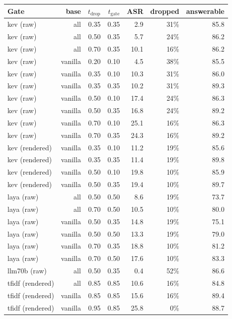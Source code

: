\par\medskip\noindent\begin{minipage}{\columnwidth}\centering{}\label{tab:a4}\footnotesize
\begin{tabular}{lrrrrrr}\toprule
Gate & base & $t_\text{drop}$ & $t_\text{gate}$ & ASR & dropped & answerable \\ \midrule
kev (raw) & all & 0.35 & 0.35 & 2.9 & 31\% & 85.8 \\
kev (raw) & all & 0.50 & 0.35 & 5.7 & 24\% & 86.2 \\
kev (raw) & all & 0.70 & 0.35 & 10.1 & 16\% & 86.2 \\
kev (raw) & vanilla & 0.20 & 0.10 & 4.5 & 38\% & 85.5 \\
kev (raw) & vanilla & 0.35 & 0.10 & 10.3 & 31\% & 86.0 \\
kev (raw) & vanilla & 0.35 & 0.35 & 10.2 & 31\% & 89.3 \\
kev (raw) & vanilla & 0.50 & 0.10 & 17.4 & 24\% & 86.3 \\
kev (raw) & vanilla & 0.50 & 0.35 & 16.8 & 24\% & 89.2 \\
kev (raw) & vanilla & 0.70 & 0.10 & 25.1 & 16\% & 86.3 \\
kev (raw) & vanilla & 0.70 & 0.35 & 24.3 & 16\% & 89.2 \\
kev (rendered) & vanilla & 0.35 & 0.10 & 11.2 & 19\% & 85.6 \\
kev (rendered) & vanilla & 0.35 & 0.35 & 11.4 & 19\% & 89.8 \\
kev (rendered) & vanilla & 0.50 & 0.10 & 19.8 & 10\% & 85.9 \\
kev (rendered) & vanilla & 0.50 & 0.35 & 19.4 & 10\% & 89.7 \\
laya (raw) & all & 0.50 & 0.50 & 8.6 & 19\% & 73.7 \\
laya (raw) & all & 0.70 & 0.50 & 10.5 & 10\% & 80.0 \\
laya (raw) & vanilla & 0.50 & 0.35 & 14.8 & 19\% & 75.1 \\
laya (raw) & vanilla & 0.50 & 0.50 & 13.3 & 19\% & 79.0 \\
laya (raw) & vanilla & 0.70 & 0.35 & 18.8 & 10\% & 81.2 \\
laya (raw) & vanilla & 0.70 & 0.50 & 17.6 & 10\% & 83.3 \\
llm70b (raw) & all & 0.50 & 0.35 & 0.4 & 52\% & 86.6 \\
tfidf (rendered) & all & 0.85 & 0.85 & 10.6 & 16\% & 84.8 \\
tfidf (rendered) & vanilla & 0.85 & 0.85 & 15.6 & 16\% & 89.4 \\
tfidf (rendered) & vanilla & 0.95 & 0.85 & 25.8 & 0\% & 88.7 \\
\bottomrule\end{tabular}\end{minipage}\par\medskip
